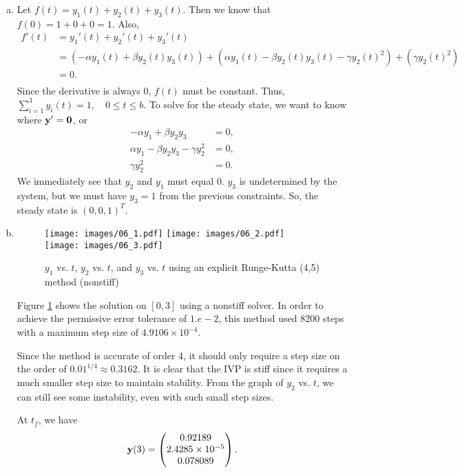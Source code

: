 \begin{solution}
  \begin{enumerate}[(a)]
    \item 
    Let $f(t) = y_1(t) + y_2(t) + y_3(t)$. Then we know that $f(0) = 1 + 0 + 0 = 1$. Also, 
    \begin{align*}
      f'(t) 
      &= y_1'(t) + y_2'(t) + y_3'(t) \\
      &= (-\alpha y_1(t) + \beta y_2(t) y_3(t)) + (\alpha y_1(t) - \beta y_2(t) y_3(t) - \gamma y_2(t)^2) + (\gamma y_2(t)^2) \\
      &= 0. \\
    \end{align*}
    Since the derivative is always $0$, $f(t)$ must be constant. Thus, $\sum_{i=1}^3 y_i(t) = 1,\quad 0 \leq t \leq b$. To solve for the steady state, we want to know where $\mathbf{y}' = \mathbf{0}$, or
    \begin{align*}
      -\alpha y_1 + \beta y_2 y_3 &= 0, \\
      \alpha y_1 - \beta y_2 y_3 - \gamma y_2^2 &= 0, \\
      \gamma y_2^2 &= 0.
    \end{align*}
    We immediately see that $y_2$ and $y_1$ must equal $0$. $y_3$ is undetermined by the system, but we must have $y_3 = 1$ from the previous constraints. So, the steady state is $(0,0,1)^T$.
    \item
    \begin{figure}
      \centering
      \texttt{[image: images/06\_1.pdf]}
      \texttt{[image: images/06\_2.pdf]}
      \texttt{[image: images/06\_3.pdf]}
      \caption{$y_1$ vs. $t$, $y_2$ vs. $t$, and $y_3$ vs. $t$ using an explicit Runge-Kutta (4,5) method (nonstiff)}
      \label{F:06_1}
    \end{figure}
    Figure \ref{F:06_1} shows the solution on $[0,3]$ using a nonstiff solver. In order to achieve the permissive error tolerance of $1.e-2$, this method used 8200 steps with a maximum step size of $4.9106 \times 10^{-4}$.
    
    Since the method is accurate of order 4, it should only require a step size on the order of $0.01^{1/4} \approx 0.3162$. It is clear that the IVP is stiff since it requires a much smaller step size to maintain stability. From the graph of $y_2$ vs. $t$, we can still see some instability, even with such small step sizes.
    
    At $t_f$, we have
    \[
      \mathbf{y}(3) = \begin{pmatrix}
        0.92189 \\
        2.4285 \times 10^{-5} \\
        0.078089
      \end{pmatrix}.
    \]
    

\end{enumerate}
\end{solution}
